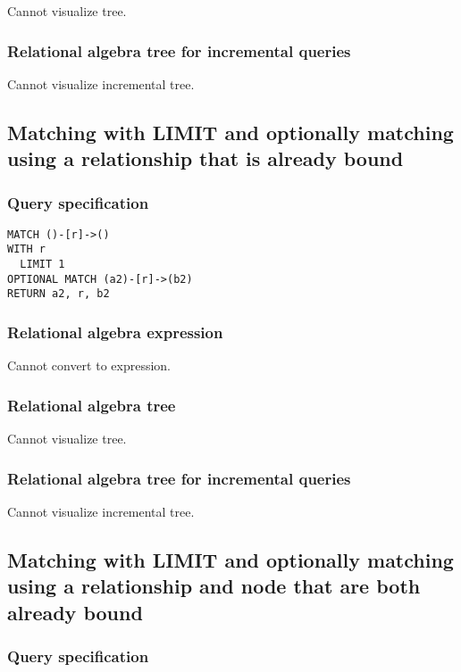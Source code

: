 Cannot visualize tree.

\subsubsection*{Relational algebra tree for incremental queries}

Cannot visualize incremental tree.

\subsection{Matching with LIMIT and optionally matching using a relationship that is already bound}

\subsubsection*{Query specification}

\begin{lstlisting}
MATCH ()-[r]->()
WITH r
  LIMIT 1
OPTIONAL MATCH (a2)-[r]->(b2)
RETURN a2, r, b2
\end{lstlisting}

\subsubsection*{Relational algebra expression}

Cannot convert to expression.

\subsubsection*{Relational algebra tree}

Cannot visualize tree.

\subsubsection*{Relational algebra tree for incremental queries}

Cannot visualize incremental tree.

\subsection{Matching with LIMIT and optionally matching using a relationship and node that are both already bound}

\subsubsection*{Query specification}

